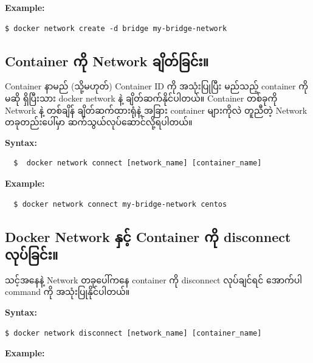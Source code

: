 \documentclass[]{article}
\begin{document}
\textbf{Example:}

\begin{verbatim}
$ docker network create -d bridge my-bridge-network
\end{verbatim}

\hypertarget{container-ux1000ux102dux102f-network-ux1001ux103bux102dux1010ux103aux1001ux103cux1004ux103aux1038}{%
\subsection{Container ကို Network
ချိတ်ခြင်း။}\label{container-ux1000ux102dux102f-network-ux1001ux103bux102dux1010ux103aux1001ux103cux1004ux103aux1038}}

Container နာမည် (သို့မဟုတ်) Container ID ကို အသုံးပြုပြီး မည်သည့်
container ကိုမဆို ရှိပြီးသား docker network နဲ့ ချိတ်ဆက်နိုင်ပါတယ်။
Container တစ်ခုကို Network နဲ့ တစ်ချိန် ချိတ်ဆက်ထားရုံနဲ့ အခြား
container များကိုလဲ တူညီတဲ့ Network တခုတည်းပေါ်မှာ
ဆက်သွယ်လုပ်ဆောင်လို့ရပါတယ်။

\textbf{Syntax:}

\begin{verbatim}
  $  docker network connect [network_name] [container_name]
\end{verbatim}

\textbf{Example:}

\begin{verbatim}
  $ docker network connect my-bridge-network centos
\end{verbatim}

\hypertarget{docker-network-ux1014ux103eux1004ux103aux1037-container-ux1000ux102dux102f-disconnect-ux101cux102fux1015ux103aux1001ux103cux1004ux103aux1038}{%
\subsection{Docker Network နှင့် Container ကို disconnect
လုပ်ခြင်း။}\label{docker-network-ux1014ux103eux1004ux103aux1037-container-ux1000ux102dux102f-disconnect-ux101cux102fux1015ux103aux1001ux103cux1004ux103aux1038}}

သင့်အနေနဲ့ Network တခုပေါ်ကနေ container ကို disconnect လုပ်ချင်ရင်
အောက်ပါ command ကို အသုံးပြုနိုင်ပါတယ်။

\textbf{Syntax:}

\begin{verbatim}
$ docker network disconnect [network_name] [container_name]
\end{verbatim}

\textbf{Example:}
\end{document}
